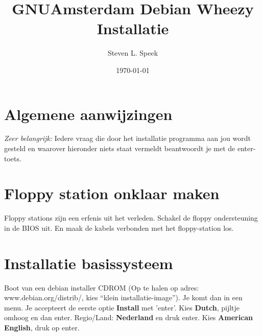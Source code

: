 \documentclass[12pt,a4paper]{article}
\begin{document}
\graphicspath{ {./images/} }
\author{Steven L. Speek}
\title{GNUAmsterdam Debian Wheezy Installatie}
\date{\today}
\maketitle
{}
\section{Algemene aanwijzingen}
\emph{Zeer belangrijk:} Iedere vraag die door het installatie programma aan jou wordt gesteld en waarover hieronder niets staat vermeldt beantwoordt je met de enter-toets.
\section{Floppy station onklaar maken}
Floppy stations zijn een erfenis uit het verleden. Schakel de floppy ondersteuning in de BIOS uit. En maak de kabels verbonden met het floppy-station los.
\section{Installatie basissysteem}
Boot van een debian installer CDROM (Op te halen op adres: www.debian.org/distrib/, kies “klein installatie-image”).
Je komt dan in een menu. 
Je accepteert de eerste optie {\bf Install } met 'enter'. Kies {\bf Dutch}, pijltje omhoog en dan enter. Regio/Land: {\bf Nederland} en druk enter. Kies {\bf American English}, druk op enter.
\end{document}
